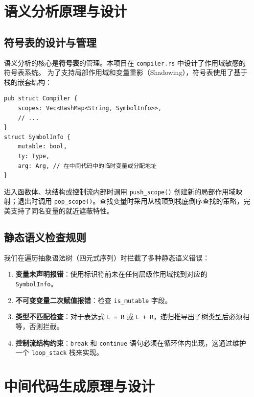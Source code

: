 \documentclass[12pt,a4paper]{ctexart}
\begin{document}
\section{语义分析原理与设计}

\subsection{符号表的设计与管理}

语义分析的核心是\textbf{符号表}的管理。本项目在 \texttt{compiler.rs} 中设计了作用域敏感的符号表系统。
为了支持局部作用域和变量重影（Shadowing），符号表使用了基于栈的嵌套结构：
\begin{lstlisting}[language=RustLike]
pub struct Compiler {
    scopes: Vec<HashMap<String, SymbolInfo>>,
    // ...
}
struct SymbolInfo {
    mutable: bool,
    ty: Type,
    arg: Arg, // 在中间代码中的临时变量或分配地址
}
\end{lstlisting}

进入函数体、块结构或控制流内部时调用 \texttt{push\_scope()} 创建新的局部作用域映射；退出时调用 \texttt{pop\_scope()}。查找变量时采用从栈顶到栈底倒序查找的策略，完美支持了同名变量的就近遮蔽特性。

\subsection{静态语义检查规则}

我们在遍历抽象语法树（四元式序列）时拦截了多种静态语义错误：
\begin{enumerate}
    \item \textbf{变量未声明报错}：使用标识符前未在任何层级作用域找到对应的 \texttt{SymbolInfo}。
    \item \textbf{不可变变量二次赋值报错}：检查 \texttt{is\_mutable} 字段。
    \item \textbf{类型不匹配检查}：对于表达式 \texttt{L = R} 或 \texttt{L + R}，递归推导出子树类型后必须相等，否则拦截。
    \item \textbf{控制流结构约束}：\texttt{break} 和 \texttt{continue} 语句必须在循环体内出现，这通过维护一个 \texttt{loop\_stack} 栈来实现。
\end{enumerate}

\section{中间代码生成原理与设计}
\end{document}
